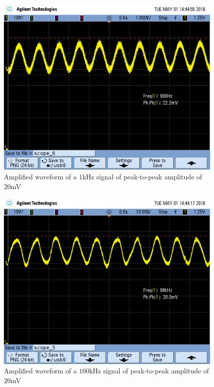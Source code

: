 \begin{figure}[h!]
	\centering
	\includegraphics[scale=0.75]{./images/SCOPE_6.PNG}
	\caption{Amplified waveform of a $1$\si{\kilo\hertz} signal of peak-to-peak amplitude of $20$\si{\milli\volt}}
	\label{fig:SCOPE_6}
\end{figure}

\FloatBarrier

\begin{figure}[h!]
	\centering
	\includegraphics[scale=0.75]{./images/SCOPE_5.PNG}
	\caption{Amplified waveform of a $100$\si{\kilo\hertz} signal of peak-to-peak amplitude of $20$\si{\milli\volt}}
	\label{fig:SCOPE_5}
\end{figure}

